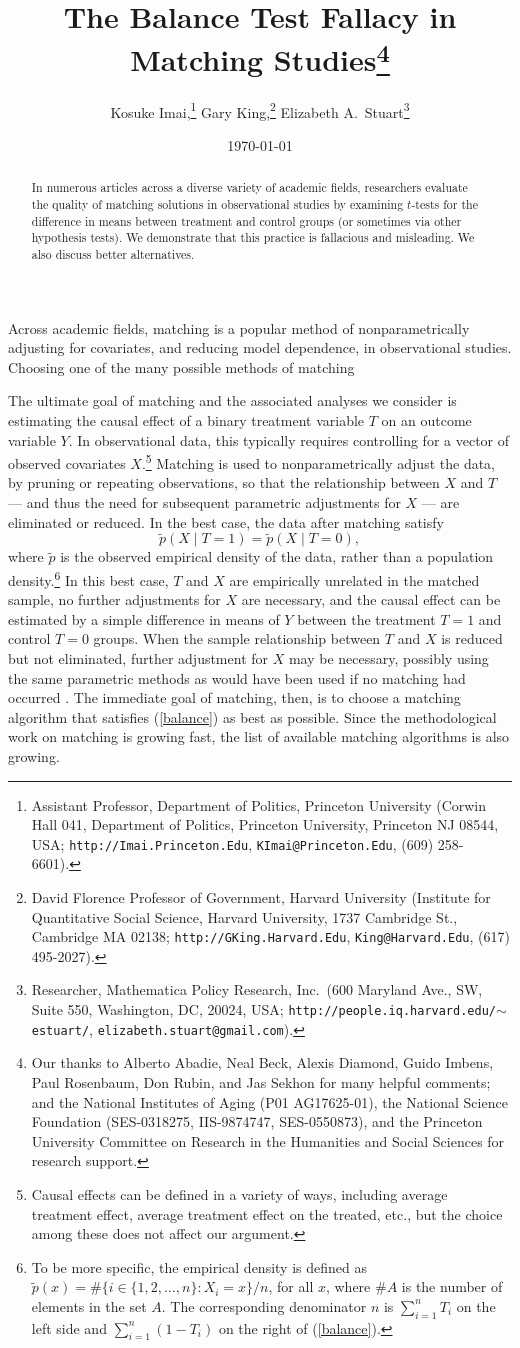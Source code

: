 \documentclass[11pt,titlepage]{article}
\title{The Balance Test Fallacy in Matching Studies\thanks{Our thanks
    to Alberto Abadie, Neal Beck, Alexis Diamond, Guido Imbens, Paul
    Rosenbaum, Don Rubin, and Jas Sekhon for many helpful comments;
    and the National Institutes of Aging (P01 AG17625-01), the
    National Science Foundation (SES-0318275, IIS-9874747,
    SES-0550873), and the Princeton University Committee on Research
    in the Humanities and Social Sciences for research support.}}
\author{Kosuke Imai,\thanks{Assistant Professor, Department of
    Politics, Princeton University (Corwin Hall 041, Department of
    Politics, Princeton University, Princeton NJ 08544, USA;
    \texttt{http://Imai.Princeton.Edu}, \texttt{KImai@Princeton.Edu},
    (609) 258-6601).}
  Gary King,\thanks{David Florence Professor of Government, Harvard
    University (Institute for Quantitative Social Science, Harvard
    University, 1737 Cambridge St., Cambridge MA 02138;
    \texttt{http://GKing.Harvard.Edu}, \texttt{King@Harvard.Edu},
    (617) 495-2027).}
  Elizabeth A.\ Stuart\thanks{Researcher, Mathematica Policy Research,
    Inc.\, (600 Maryland Ave., SW, Suite 550, Washington, DC, 20024,
    USA; \texttt{http://people.iq.harvard.edu/$\sim$estuart/},
    \texttt{elizabeth.stuart@gmail.com}).}}
\date{\today}
\begin{document}
\maketitle

\begin{abstract}
  In numerous articles across a diverse variety of academic fields,
  researchers evaluate the quality of matching solutions in
  observational studies by examining $t$-tests for the difference in
  means between treatment and control groups (or sometimes via other
  hypothesis tests).  We demonstrate that this practice is fallacious
  and misleading.  We also discuss better alternatives.
\end{abstract}

Across academic fields, matching is a popular method of
nonparametrically adjusting for covariates, and reducing model
dependence, in observational studies.  Choosing one of the many
possible methods of matching

The ultimate goal of matching and the associated analyses we consider
is estimating the causal effect of a binary treatment variable $T$ on
an outcome variable $Y$.  In observational data, this typically
requires controlling for a vector of observed covariates
$X$.\footnote{Causal effects can be defined in a variety of ways,
  including average treatment effect, average treatment effect on the
  treated, etc., but the choice among these does not affect our
  argument.}  Matching is used to nonparametrically adjust the data,
by pruning or repeating observations, so that the relationship between
$X$ and $T$ --- and thus the need for subsequent parametric
adjustments for $X$ --- are eliminated or reduced.  In the best case,
the data after matching satisfy
\begin{equation}
  \label{balance}
  \tilde p(X\mid T=1) = \tilde p(X\mid T=0),
\end{equation}
where $\tilde p$ is the observed empirical density of the data, rather
than a population density.\footnote{To be more specific, the empirical
  density is defined as $\tilde p(x) = \# \{ i\in \{1, 2, \dots, n \}:
  X_i = x \} / n$, for all $x$, where $\#A$ is the number of elements
  in the set $A$.  The corresponding denominator $n$ is $\sum_{i=1}^n
  T_i$ on the left side and $\sum_{i=1}^n (1-T_i)$ on the right of
  (\ref{balance}).} In this best case, $T$ and $X$ are empirically
unrelated in the matched sample, no further adjustments for $X$ are
necessary, and the causal effect can be estimated by a simple
difference in means of $Y$ between the treatment $T=1$ and control
$T=0$ groups.  When the sample relationship between $T$ and $X$ is
reduced but not eliminated, further adjustment for $X$ may be
necessary, possibly using the same parametric methods as would have
been used if no matching had occurred \citep{HoImaKin06}.  The
immediate goal of matching, then, is to choose a matching algorithm
that satisfies (\ref{balance}) as best as possible.  Since the
methodological work on matching is growing fast, the list of available
matching algorithms is also growing.
\end{document}
